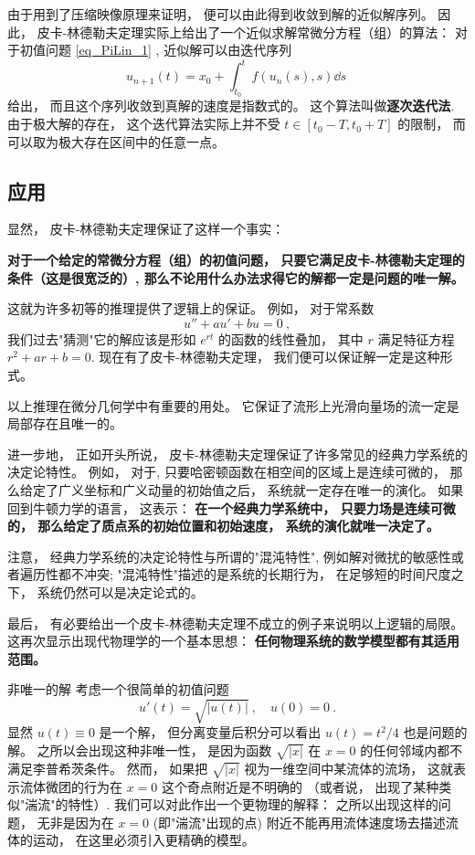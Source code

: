 由于用到了压缩映像原理来证明， 便可以由此得到收敛到解的近似解序列。 因此， 皮卡-林德勒夫定理实际上给出了一个近似求解常微分方程（组）的算法： 对于初值问题 \autoref{eq_PiLin_1} , 近似解可以由迭代序列
$$
u_{n+1}(t)=x_0+\int_{t_0}^tf(u_n(s),s)\dd s~
$$
给出， 而且这个序列收敛到真解的速度是指数式的。 这个算法叫做\textbf{逐次迭代法}. 由于极大解的存在， 这个迭代算法实际上并不受 $t\in [t_0-T,t_0+T]$ 的限制， 而可以取为极大存在区间中的任意一点。

\subsection{应用}
显然， 皮卡-林德勒夫定理保证了这样一个事实： 

\textbf{对于一个给定的常微分方程（组）的初值问题， 只要它满足皮卡-林德勒夫定理的条件（这是很宽泛的）, 那么不论用什么办法求得它的解都一定是问题的唯一解。}

这就为许多初等的推理提供了逻辑上的保证。 例如， 对于常系数
$$
u''+au'+bu=0~,
$$
我们过去"猜测"它的解应该是形如 $e^{rt}$ 的函数的线性叠加， 其中 $r$ 满足特征方程 $r^2+ar+b=0$. 现在有了皮卡-林德勒夫定理， 我们便可以保证解一定是这种形式。 

以上推理在微分几何学中有重要的用处。 它保证了流形上光滑向量场的流一定是局部存在且唯一的。

进一步地， 正如开头所说， 皮卡-林德勒夫定理保证了许多常见的经典力学系统的决定论特性。 例如， 对于, 只要哈密顿函数在相空间的区域上是连续可微的， 那么给定了广义坐标和广义动量的初始值之后， 系统就一定存在唯一的演化。 如果回到牛顿力学的语言， 这表示： \textbf{在一个经典力学系统中， 只要力场是连续可微的， 那么给定了质点系的初始位置和初始速度， 系统的演化就唯一决定了。}

注意， 经典力学系统的决定论特性与所谓的"混沌特性", 例如解对微扰的敏感性或者遍历性都不冲突; "混沌特性"描述的是系统的长期行为， 在足够短的时间尺度之下， 系统仍然可以是决定论式的。

最后， 有必要给出一个皮卡-林德勒夫定理不成立的例子来说明以上逻辑的局限。 这再次显示出现代物理学的一个基本思想： \textbf{任何物理系统的数学模型都有其适用范围。}
\begin{example}{非唯一的解}
考虑一个很简单的初值问题
$$
u'(t)=\sqrt{|u(t)|}~,\quad u(0)=0~.
$$
显然 $u(t)\equiv0$ 是一个解， 但分离变量后积分可以看出 $u(t)=t^2/4$ 也是问题的解。 之所以会出现这种非唯一性， 是因为函数 $\sqrt{|x|}$ 在 $x=0$ 的任何邻域内都不满足李普希茨条件。 然而， 如果把 $\sqrt{|x|}$ 视为一维空间中某流体的流场， 这就表示流体微团的行为在 $x=0$ 这个奇点附近是不明确的 （或者说， 出现了某种类似"湍流"的特性）. 我们可以对此作出一个更物理的解释： 之所以出现这样的问题， 无非是因为在 $x=0$ (即"湍流"出现的点) 附近不能再用流体速度场去描述流体的运动， 在这里必须引入更精确的模型。
\end{example}
